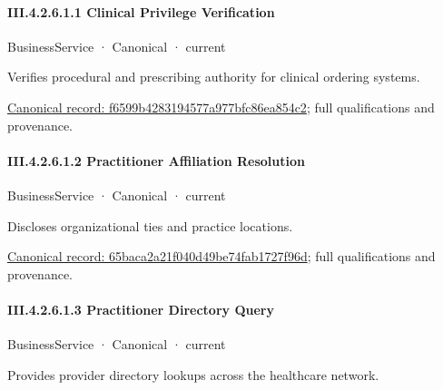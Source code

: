 \paragraph*{III.4.2.6.1.1 Clinical Privilege Verification}
\label{navigation:III.4.2.6.1.1}

\label{element:f6599b4283194577a977bfc86ea854c2}
{\small BusinessService · Canonical · current}\par

Verifies procedural and prescribing authority for clinical ordering systems.


{\footnotesize \href{../../../../../../../continuum/business/business-service/f6599b4283194577a977bfc86ea854c2.md}{Canonical record: f6599b4283194577a977bfc86ea854c2}; full qualifications and provenance.}\par
\paragraph*{III.4.2.6.1.2 Practitioner Affiliation Resolution}
\label{navigation:III.4.2.6.1.2}

\label{element:65baca2a21f040d49be74fab1727f96d}
{\small BusinessService · Canonical · current}\par

Discloses organizational ties and practice locations.


{\footnotesize \href{../../../../../../../continuum/business/business-service/65baca2a21f040d49be74fab1727f96d.md}{Canonical record: 65baca2a21f040d49be74fab1727f96d}; full qualifications and provenance.}\par
\paragraph*{III.4.2.6.1.3 Practitioner Directory Query}
\label{navigation:III.4.2.6.1.3}

\label{element:ed8e6a3d891340fe92fc3201abd15c46}
{\small BusinessService · Canonical · current}\par

Provides provider directory lookups across the healthcare network.


